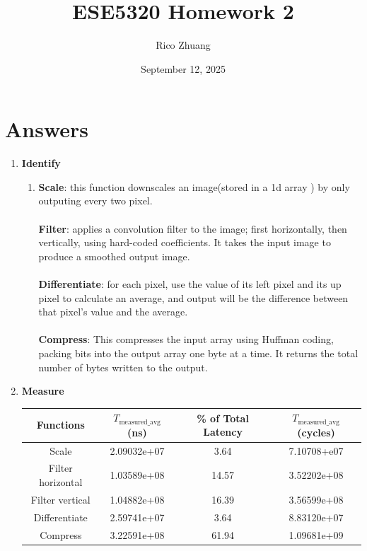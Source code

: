 \documentclass[12pt]{article}
\title{ESE5320 Homework 2}
\author{Rico Zhuang}
\date{September 12, 2025}
\begin{document}
\maketitle

\section*{Answers}

\begin{enumerate}
    \item \textbf{Identify}
    \begin{enumerate}[label=\arabic*)]
        \item \textbf{Scale}: this function downscales an image(stored in a 1d array ) by only outputing every two pixel.
        \\\\ \textbf{Filter}: applies a convolution filter to the image; first horizontally, then vertically, using hard-coded coefficients. It takes the input image to produce a smoothed output image.
        \\\\ \textbf{Differentiate}: for each pixel, use the value of its left pixel and its up pixel to calculate an average, and output will be the difference between that pixel's value and the average.
        \\\\ \textbf{Compress}: This compresses the input array using Huffman coding, packing bits into the output array one byte at a time. It returns the total number of bytes written to the output.


    \end{enumerate}

    \item  \textbf{Measure}


        \begin{tabular}{|c|c|c|c|}
        \hline
        Functions & $T_{\text{measured\_avg}}$(ns) & \% of Total Latency & $T_{\text{measured\_avg}}$(cycles) \\
        \hline
        Scale & 2.09032e+07 & 3.64 & 7.10708+e07\\
        \hline
        Filter horizontal & 1.03589e+08 & 14.57 & 3.52202e+08\\
        \hline
        Filter vertical & 1.04882e+08 & 16.39 & 3.56599e+08\\
        \hline
        Differentiate & 2.59741e+07 & 3.64 & 8.83120e+07\\
        \hline
        Compress & 3.22591e+08 & 61.94 & 1.09681e+09\\
        \hline


\end{tabular}
\end{enumerate}
\end{document}
